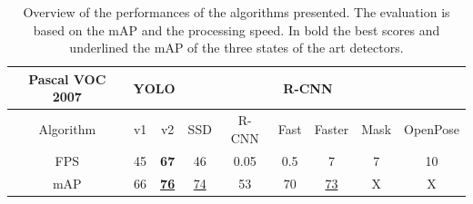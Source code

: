 \begin{table}[!h]
	\centering
	\begin{tabular}{|c|c|c|c|c|c|c|c|c|}
		\hline
		Pascal VOC 2007 & \multicolumn{2}{c|}{YOLO} &     & \multicolumn{4}{c|}{R-CNN}   &          \\ \hline
		Algorithm       & v1          & v2          & SSD & R-CNN & Fast & Faster & Mask & OpenPose \\ \hline
		FPS             & 45          & \textbf{67}          & 46  & 0.05  & 0.5  & 7      & 7    & 10       \\ \hline
		mAP             & 66          & \underline{\textbf{76}}          & \underline{74}  & 53    & 70   & \underline{73}     & X    & X        \\ \hline
	\end{tabular}
	\captionsetup{margin=0.5cm}
	\caption[Comparison of mAP and FPS for the object detector algorithms.]{Overview of the performances of the algorithms presented. The evaluation is based on the mAP and the processing speed. In bold the best scores and underlined the mAP of the three states of the art detectors.}
	\label{tab:detectionPerformances}
\end{table}
